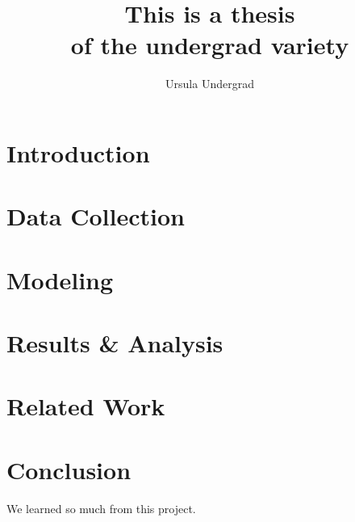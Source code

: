 \documentclass[twoside]{report}
\begin{document}
    \title{This is a thesis\\ of the undergrad variety}
\author{Ursula Undergrad}

\beforepreface
{}

\afterpreface

\chapter{Introduction}


\chapter{Data Collection}


\chapter{Modeling}


\chapter{Results \& Analysis}


\chapter{Related Work}


\chapter{Conclusion}
We learned so much from this project.

\appendix

\renewcommand{\bibname}{Bibliography}


\end{document}
